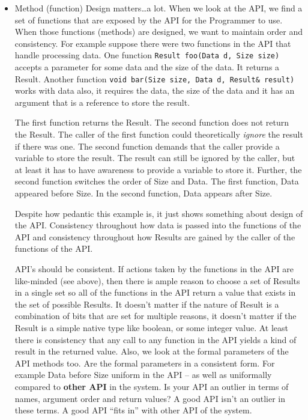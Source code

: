 \documentclass[12pt]{article}
\begin{document}
\begin{enumerate}
\begin{enumerate}
\begin{itemize}
Many packages exist for assisting with this goal of good API documentation.
In-file markers (think: Doxygen), and other varieties of in-file markings
help automate documentation generation.  Even without the generation
of documentation from in-file markings, the comments in the code itself
(or accompanying MarkDown, or manual pages) are essential for
both the maintainers of the API and the Programmers using the API.
\item Method (function) Design matters\ldots a lot.
   When we look at the API, we find a set of functions that are exposed
   by the API for the Programmer to use.  When those functions (methods)
are designed, we want to maintain order and consistency.  For example
suppose there were two functions in the API that handle processing
data.  One function {\texttt{Result foo(Data d, Size size)}} accepts
a parameter for some data and the size of the data. It returns a
Result.  Another function {\texttt{void bar(Size size, 
Data d, Result\& result)}}
works with data also, it requires the data, the size of the data
and it has an argument that is a reference to store the result. 
\par
The first function returns the Result.  The second function does not
return the Result.  The caller of the first function could theoretically
{\textit{ignore}} the result if there was one.  The second function
demands that the caller provide a variable to store the result.  The
result can still be ignored by the caller, but at least it has to 
have awareness to provide a variable to store it. Further, the second
function switches the order of Size and Data.  The first function, Data
appeared before Size.  In the second function, Data appears after Size.
\par
Despite how pedantic this example is, it just shows something
about design of the API.  Consistency throughout how data is passed into
the functions of the API and consistency throughout how Results are
gained by the caller of the functions of the API.
\par 
API's should be consistent.  If actions taken by the functions in the API
are like-minded (see above), then there is ample reason to choose a set
of Results in a single set so all of the functions in the API return
a value that exists in the set of possible Results.   It doesn't matter
if the nature of Result is a combination of bits that are set for multiple
reasons, it doesn't matter if the Result is a simple native type like
boolean, or some integer value.  At least there is consistency
that any call to any function in the API yields a kind of result in
the returned value.  Also, we look at the formal parameters of the API
methods too.  Are the formal parameters in a consistent form.  For example
Data before Size uniform in the API -- as well as  uniformally 
compared to {\textbf{other API}} in the system.  Is your API an outlier
in terms of names, argument order and return values?   A good API isn't
an outlier in these terms.  A good API ``fits in'' with other API of
the system.
  \end{itemize}
\end{enumerate}  %


\end{enumerate}
\end{document}

